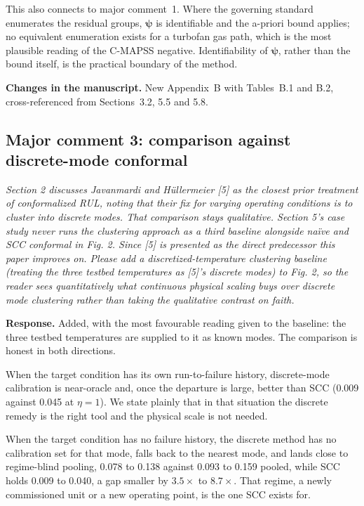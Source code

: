 \documentclass[11pt,a4paper]{article}
\newenvironment{comment}
  {\begin{list}{}{\leftmargin=6mm \rightmargin=2mm}\item[]\color{quoteline}\itshape}
  {\end{list}}
\newcommand{\where}[1]{\textbf{Changes in the manuscript.} #1}
\begin{document}
This also connects to major comment~1. Where the governing standard enumerates the residual groups,
$\boldsymbol\psi$ is identifiable and the a-priori bound applies; no equivalent enumeration exists
for a turbofan gas path, which is the most plausible reading of the C-MAPSS negative. Identifiability
of $\boldsymbol\psi$, rather than the bound itself, is the practical boundary of the method.

\where{New Appendix~B with Tables~B.1 and B.2, cross-referenced from Sections~3.2, 5.5 and 5.8.}

\subsection*{Major comment 3: comparison against discrete-mode conformal}
\begin{comment}
Section 2 discusses Javanmardi and Hüllermeier [5] as the closest prior treatment of conformalized
RUL, noting that their fix for varying operating conditions is to cluster into discrete modes. That
comparison stays qualitative. Section 5's case study never runs the clustering approach as a third
baseline alongside naïve and SCC conformal in Fig. 2. Since [5] is presented as the direct
predecessor this paper improves on. Please add a discretized-temperature clustering baseline
(treating the three testbed temperatures as [5]'s discrete modes) to Fig. 2, so the reader sees
quantitatively what continuous physical scaling buys over discrete mode clustering rather than
taking the qualitative contrast on faith.
\end{comment}

\noindent\textbf{Response.} Added, with the most favourable reading given to the baseline: the
three testbed temperatures are supplied to it as known modes. The comparison is honest in both
directions.

When the target condition has its own run-to-failure history, discrete-mode calibration is
near-oracle and, once the departure is large, better than SCC (0.009 against 0.045 at $\eta=1$). We
state plainly that in that situation the discrete remedy is the right tool and the physical scale is
not needed.

When the target condition has no failure history, the discrete method has no calibration set for
that mode, falls back to the nearest mode, and lands close to regime-blind pooling, 0.078 to 0.138
against 0.093 to 0.159 pooled, while SCC holds 0.009 to 0.040, a gap smaller by $3.5\times$ to
$8.7\times$. That regime, a newly commissioned unit or a new operating point, is the one SCC exists
for.
\end{document}
